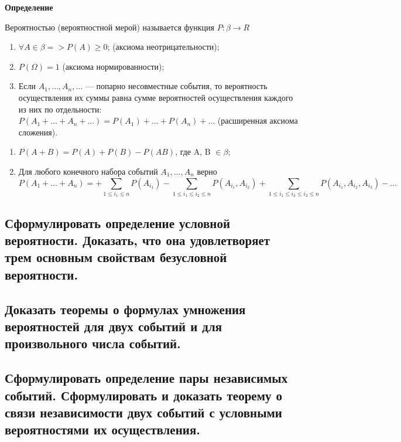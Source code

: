 \textbf{Определение}

Вероятностью (вероятностной мерой) называется функция $P: \beta \rightarrow R$

\begin{enumerate}
	\item $\forall A \in \beta => P(A) \geqslant 0$; (аксиома неотрицательности);
	\item $P(\Omega) = 1$ (аксиома нормированности);
	\item Если $A_1, \dots, A_n, \dots$ --- попарно несовместные события, то вероятность осуществления их суммы равна сумме вероятностей осуществления каждого из них по отдельности: $P(A_1 + \dots + A_n + \dots) = P(A_1) + \dots + P(A_n) + \dots$ (расширенная аксиома сложения). 
\end{enumerate}

\begin{enumerate}

	\item $P(A + B) = P(A) + P(B) - P(AB)$, где A, B $\in \beta$;
	\item Для любого конечного набора событий $A_1, \dots, A_n$ верно
	\begin{equation}
		P(A_1 + \dots + A_n) = + \sum\limits_{1 \leqslant i_1 \leqslant n}P(A_{i_1}) - \sum\limits_{1 \leqslant i_1 \leqslant i_2 \leqslant n}P(A_{i_1}, A_{i_2}) + \sum\limits_{1 \leqslant i_1 \leqslant i_2 \leqslant i_3 \leqslant n}P(A_{i_1}, A_{i_2}, A_{i_3}) - \dots
	\end{equation}
\end{enumerate}

\subsection{Сформулировать определение условной вероятности. Доказать, что она удовлетворяет трем основным свойствам безусловной вероятности.}



\subsection{Доказать теоремы о формулах умножения вероятностей для двух событий и для произвольного числа событий.}
\subsection{Сформулировать определение пары независимых событий. Сформулировать и доказать теорему о связи независимости двух событий с условными вероятностями их осуществления.}



